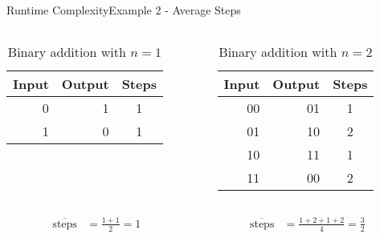 \begin{frame}{Runtime Complexity}{Example 2 - Average Steps}
  \vspace{-3em}
  \begin{columns}
    \begin{column}[t]{0.5\linewidth}
      \begin{table}[!t]%
        \caption{Binary addition with $n=1$}%
        \label{tab:runtime:binary_addition_one}%
        \begin{tabular}{rrc}%
          Input & Output & Steps\\
          \midrule
          0 & 1 & 1\\
          1 & 0 & 1
        \end{tabular}
      \end{table}
    \end{column}
    \begin{column}[t]{0.5\linewidth}
      \begin{table}[!t]%
        \caption{Binary addition with $n=2$}%
        \label{tab:runtime:binary_addition_two}%
        \begin{tabular}{rrc}%
          Input & Output & Steps\\
          \midrule
          00 & 01 & 1\\
          01 & 10 & 2\\
          10 & 11 & 1\\
          11 & 00 & 2
        \end{tabular}
      \end{table}
    \end{column}
  \end{columns}
  \begin{columns}
   \begin{column}{0.5\linewidth}
      \begin{align*}
        \overline{\text{steps}} &= \frac{1+1}{2} = 1\\[0.5em]
      \end{align*}
    \end{column}
    \begin{column}{0.5\linewidth}
      \begin{align*}
        \overline{\text{steps}} &= \frac{1+2+1+2}{4} = \frac{3}{2}\\[0.5em]
      \end{align*}
    \end{column}
  \end{columns}
\end{frame}

